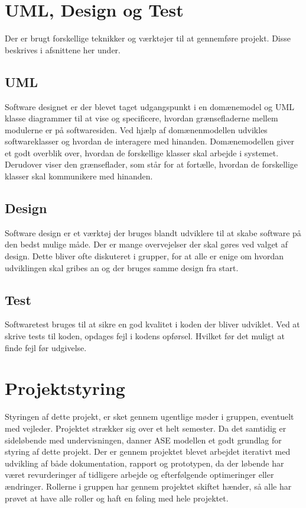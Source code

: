 \section{UML, Design og Test}
Der er brugt forskellige teknikker og værktøjer til at gennemføre projekt. Disse beskrives i afsnittene her under.
\subsection{UML}
Software designet er der blevet taget udgangspunkt i en domænemodel og UML klasse diagrammer til at vise og specificere, hvordan grænsefladerne mellem modulerne er på softwaresiden.
Ved hjælp af domænenmodellen udvikles softwareklasser og hvordan de interagere med hinanden.
Domænemodellen giver et godt overblik over, hvordan de forskellige klasser skal arbejde i systemet. Derudover viser den grænseflader, som står for at fortælle, hvordan de forskellige klasser skal kommunikere med hinanden.

\subsection{Design}
Software design er et værktøj der bruges blandt udviklere til at skabe software på den bedst mulige måde. Der er mange overvejelser der skal gøres ved valget af design. Dette bliver ofte diskuteret i grupper, for at alle er enige om hvordan udviklingen skal gribes an og der bruges samme design fra start.

\subsection{Test}
Softwaretest bruges til at sikre en god kvalitet i koden der bliver udviklet. Ved at skrive tests til koden, opdages fejl i kodens opførsel. Hvilket før det muligt at finde fejl før udgivelse.
\newline

\section{Projektstyring}
Styringen af dette projekt, er sket gennem ugentlige møder i gruppen, eventuelt med vejleder.
Projektet strækker sig over et helt semester.  Da det samtidig er sideløbende med undervisningen, danner ASE modellen et godt grundlag for styring af dette projekt. 
Der er gennem projektet blevet arbejdet iterativt med udvikling af både dokumentation, rapport og prototypen, da der løbende har været revurderinger af tidligere arbejde og efterfølgende optimeringer eller ændringer. 
Rollerne i gruppen har gennem projektet skiftet hænder, så alle har prøvet at have alle roller og haft en føling med hele projektet.

